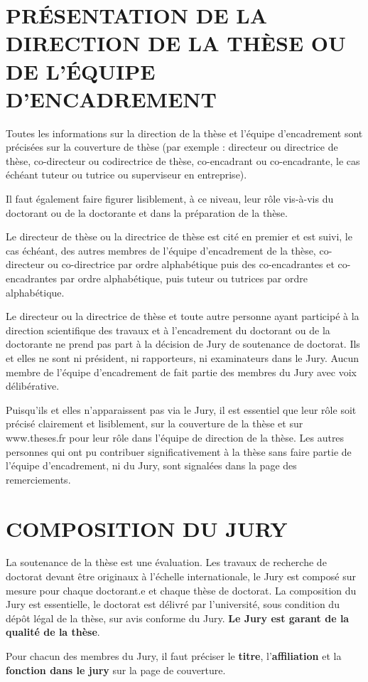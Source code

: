 \documentclass[main=french,a4paper]{book}
\begin{document}
\chapter{PRÉSENTATION DE LA DIRECTION DE LA THÈSE OU DE L’ÉQUIPE D’ENCADREMENT}
Toutes les informations sur la direction de la thèse et l’équipe d’encadrement sont précisées sur la couverture de thèse (par exemple : directeur ou directrice de thèse, co-directeur ou codirectrice de thèse, co-encadrant ou co-encadrante, le cas échéant tuteur ou tutrice ou superviseur en entreprise).\\ \par
Il faut également faire figurer lisiblement, à ce niveau, leur rôle vis-à-vis du doctorant ou de la doctorante et dans la préparation de la thèse.\\ \par
Le directeur de thèse ou la directrice de thèse est cité en premier et est suivi, le cas échéant, des autres membres de l’équipe d’encadrement de la thèse, co-directeur ou co-directrice par ordre alphabétique puis des co-encadrantes et co-encadrantes par ordre alphabétique, puis tuteur ou tutrices par ordre alphabétique.\\ \par
Le directeur ou la directrice de thèse et toute autre personne ayant participé à la direction scientifique des travaux et à l’encadrement du doctorant ou de la doctorante ne prend pas part à la décision de Jury de soutenance de doctorat. Ils et elles ne sont ni président, ni rapporteurs, ni examinateurs dans le Jury. Aucun membre de l’équipe d’encadrement de fait partie des membres du Jury avec voix délibérative. \\ \par
Puisqu’ils et elles n’apparaissent pas via le Jury, il est essentiel que leur rôle soit précisé clairement et lisiblement, sur la couverture de la thèse et sur www.theses.fr pour leur rôle dans l’équipe de direction de la thèse.
Les autres personnes qui ont pu contribuer significativement à la thèse sans faire partie de l’équipe d’encadrement, ni du Jury, sont signalées dans la page des remerciements. 


\chapter{COMPOSITION DU JURY }
La soutenance de la thèse est une évaluation. Les travaux de recherche de doctorat devant être originaux à l’échelle internationale, le Jury est composé sur mesure pour chaque doctorant.e et chaque thèse de doctorat. La composition du Jury est essentielle, le doctorat est délivré par l’université, sous condition du dépôt légal de la thèse, sur avis conforme du Jury. \textbf{Le Jury est garant de la qualité de la thèse}.\\ \par
Pour chacun des membres du Jury, il faut préciser le \textbf{titre}, l’\textbf{affiliation} et la \textbf{fonction dans le jury} sur la page de couverture.
\end{document}
